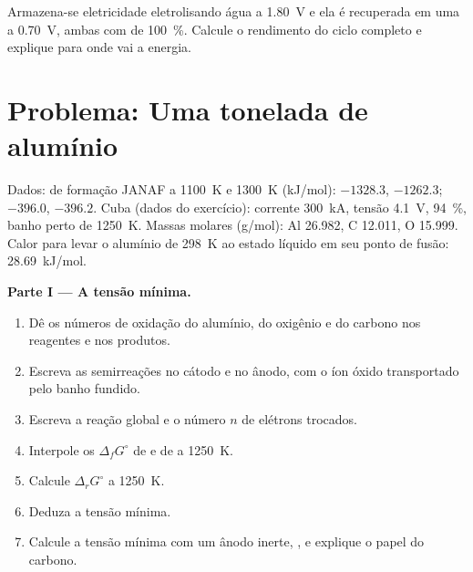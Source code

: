 \begin{exercise}[$\star\star\star$]\label{exo:b2:batteries-electrolysis:12}
Armazena-se eletricidade eletrolisando água a \qty{1.80}{V} e ela é recuperada
em uma  a \qty{0.70}{V}, ambas com  de
100~\%. Calcule o rendimento do ciclo completo e explique para onde vai a
energia.
\end{exercise}

\section{Problema: Uma tonelada de alumínio}

\begin{problem}
\label{pb:b2:batteries-electrolysis:1}
Dados:  de formação JANAF a \qty{1100}{K} e \qty{1300}{K}
(\unit{kJ/mol}):  $-1328.3$, $-1262.3$;  $-396.0$, $-396.2$. Cuba
(dados do exercício): corrente \qty{300}{kA}, tensão \qty{4.1}{V},  94~\%, banho perto de \qty{1250}{K}. Massas molares (\unit{g/mol}):
Al 26.982, C 12.011, O 15.999. Calor para levar o alumínio de \qty{298}{K} ao
estado líquido em seu ponto de fusão: \qty{28.69}{kJ/mol}.

\medskip
\noindent\textbf{Parte I --- A tensão mínima.}
\begin{enumerate}
  \item Dê os números de oxidação do alumínio, do oxigênio e do carbono nos
        reagentes e nos produtos.
  \item Escreva as semirreações no cátodo e no ânodo, com o íon óxido
         transportado pelo banho fundido.
  \item Escreva a reação global e o número $n$ de elétrons trocados.
  \item Interpole os $\Delta_f G^\circ$ de  e de  a \qty{1250}{K}.
  \item Calcule $\Delta_r G^\circ$ a \qty{1250}{K}.
  \item Deduza a tensão mínima.
  \item Calcule a tensão mínima com um ânodo inerte,
        , e explique o papel do carbono.
\end{enumerate}


\end{problem}
